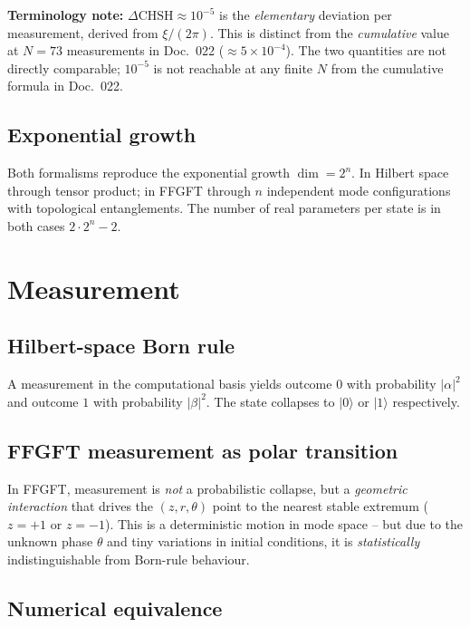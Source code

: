 \textbf{Terminology note:} $\Delta\text{CHSH} \approx 10^{-5}$ is the
\emph{elementary} deviation per measurement, derived from $\xi/(2\pi)$.
This is distinct from the \emph{cumulative} value at $N = 73$
measurements in Doc.~022 ($\approx 5 \times 10^{-4}$). The two
quantities are not directly comparable; $10^{-5}$ is not reachable
at any finite $N$ from the cumulative formula in Doc.~022.

\subsection{Exponential growth}

Both formalisms reproduce the exponential growth $\dim = 2^n$. In
Hilbert space through tensor product; in FFGFT through $n$
independent mode configurations with topological entanglements. The
number of real parameters per state is in both cases $2 \cdot 2^n - 2$.

\section{Measurement}

\subsection{Hilbert-space Born rule}

A measurement in the computational basis yields outcome $0$ with
probability $|\alpha|^2$ and outcome $1$ with probability $|\beta|^2$.
The state collapses to $|0\rangle$ or $|1\rangle$ respectively.

\subsection{FFGFT measurement as polar transition}

In FFGFT, measurement is \emph{not} a probabilistic collapse, but a
\emph{geometric interaction} that drives the $(z, r, \theta)$ point
to the nearest stable extremum ($z = +1$ or $z = -1$). This is a
deterministic motion in mode space -- but due to the unknown phase
$\theta$ and tiny variations in initial conditions, it is
\emph{statistically} indistinguishable from Born-rule behaviour.

\subsection{Numerical equivalence}

